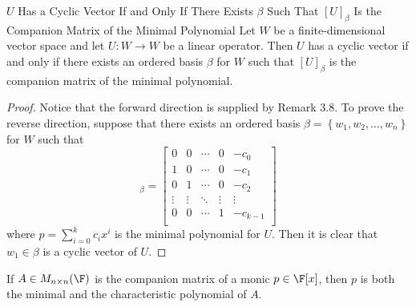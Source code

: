 \documentclass[math_245.tex]{subfiles}
\begin{document}
    \begin{theorem}{$U$ Has a Cyclic Vector If and Only If There Exists $\beta$ Such That $[U]_\beta$ Is the Companion Matrix of the Minimal Polynomial}
        Let $W$ be a finite-dimensional vector space and let $U:W\to W$ be a linear operator. Then $U$ has a cyclic vector if and only if there exists an ordered basis $\beta$ for $W$ such that $[U]_\beta$ is the companion matrix of the minimal polynomial.
    \end{theorem}

    \begin{proof}
        Notice that the forward direction is supplied by Remark 3.8. To prove the reverse direction, suppose that there exists an ordered basis $\beta = \left\lbrace w_1, w_2,\ldots, w_n \right\rbrace $ for $W$ such that
        \begin{equation*}
            [U]_\beta =
            \begin{bmatrix}
                0 & 0 & \cdots & 0 & -c_0 \\
                1 & 0 & \cdots & 0 & -c_1 \\
                0 & 1 & \cdots & 0 & -c_2 \\
                \vdots & \vdots & \ddots  & \vdots & \vdots \\
                0 & 0 & \cdots & 1 & -c_{k-1} \\
            \end{bmatrix}
        \end{equation*}
        where $p = \sum^{k}_{i=0} c_ix^i$ is the minimal polynomial for $U$. Then it is clear that $w_1\in\beta$ is a cyclic vector of $U$.
    \end{proof}

    \begin{cor}{}
        If $A\in M_{n\times n}(\F)$ is the companion matrix of a monic $p\in\F[x]$, then $p$ is both the minimal and the characteristic polynomial of $A$.
    \end{cor}	
\end{document}
